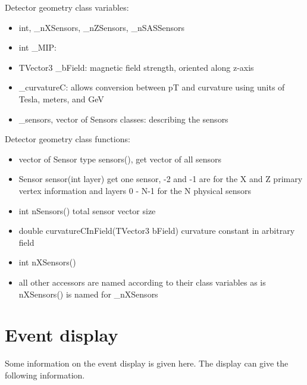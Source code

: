 \documentclass[aps,prd,superscriptaddress,floatfix]{revtex4}
\begin{document}
Detector geometry class variables:
\begin{itemize}
\item int, \_nXSensors, \_nZSensors, \_nSASSensors 
\item int \_MIP: 
\item TVector3 \_bField: magnetic field strength, oriented along z-axis
\item \_curvatureC: allows conversion between pT and curvature using units of Tesla, meters, and GeV
\item \_sensors, vector of Sensors classes: describing the sensors
\end{itemize}

Detector geometry class functions:
\begin{itemize}
\item vector of Sensor type sensors(), get vector of all sensors
\item Sensor sensor(int layer) get one sensor, -2 and -1 are for the X and Z
  primary vertex information and layers 0 - N-1 for the N physical
  sensors
\item int nSensors() total sensor vector size
\item double curvatureCInField(TVector3 bField) curvature constant in arbitrary field
\item int nXSensors()
\item all other accessors are named according to their class variables
  as is nXSensors() is named for \_nXSensors
\end{itemize}

\section{Event display}

Some information on the event display is given here.  The display can give the
following information.  
\end{document}
